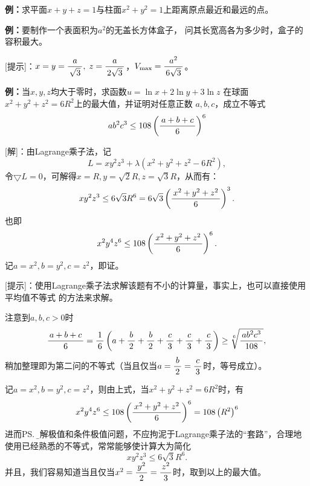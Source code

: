 {\bf 例：}求平面$x+y+z=1$与柱面$x^2+y^2=1$上距离原点最近和最远的点。
\begin{center}
\end{center}

{\bf 例：}要制作一个表面积为$a^2$的无盖长方体盒子，
问其长宽高各为多少时，盒子的容积最大。

[提示]：$x=y=\displaystyle\frac{\,{a}\,}{\,{\sqrt 3}\,},\;z=\displaystyle\frac{\,{a}\,}{\,{2\sqrt3}\,}$，$V_{\max}=\displaystyle\frac{\,{a^2}\,}{\,{6\sqrt 3}\,}$。

{\bf 例：}当$x,y,z$均大于零时，求函数$u=\ln x+2\ln y+3\ln z$
在球面$x^2+y^2+z^2=6R^2$上的最大值，并证明对任意正数
$a,b,c$，成立不等式
$$ab^2c^3\leq 108\left(\displaystyle\frac{\,{a+b+c}\,}{\,{6}\,}\right)^6$$

[解]：由Lagrange乘子法，记
$$L=xy^2z^3+\lambda(x^2+y^2+z^2-6R^2),$$
令$\bigtriangledown L=0$，可解得$x=R,y=\sqrt2 R,z=\sqrt3 R$，从而有：
$$xy^2z^3\leq 6\sqrt 3R^6=6\sqrt 3\left(\displaystyle\frac{\,{x^2+y^2+z^2}\,}{\,{6}\,}\right)^3.$$
也即
$$x^2y^4z^6\leq 108\left(\displaystyle\frac{\,{x^2+y^2+z^2}\,}{\,{6}\,}\right)^6.$$
记$a=x^2,b=y^2,c=z^2$，即证。\fin

[提示]：使用Lagrange乘子法求解该题有不小的计算量，事实上，也可以直接使用平均值不等式
的方法来求解。

注意到$a,b,c>0$时
$$\displaystyle\frac{\,{a+b+c}\,}{\,{6}\,}=\displaystyle\frac{\,{1}\,}{\,{6}\,}\left(a+\displaystyle\frac{\,{b}\,}{\,{2}\,}+\displaystyle\frac{\,{b}\,}{\,{2}\,}+\displaystyle\frac{\,{c}\,}{\,{3}\,}+\displaystyle\frac{\,{c}\,}{\,{3}\,}+\displaystyle\frac{\,{c}\,}{\,{3}\,}\right)
\geq \sqrt[6]{\displaystyle\frac{\,{ab^2c^3}\,}{\,{108}\,}},$$
稍加整理即为第二问的不等式（当且仅当$a=\displaystyle\frac{\,{b}\,}{\,{2}\,}=\displaystyle\frac{\,{c}\,}{\,{3}\,}$时，等号成立）。

记$a=x^2,b=y^2,c=z^2$，则由上式，当$x^2+y^2+z^2=6R^2$时，有
$$x^2y^4z^6\leq108\left(\displaystyle\frac{\,{x^2+y^2+z^2}\,}{\,{6}\,}\right)^6
=108\left(R^2\right)^6$$
进而\ps{\b 求解极值和条件极值问题，不应拘泥于Lagrange乘子法的“套路”，合理地
使用已经熟悉的不等式，常常能够使计算大为简化}
$$xy^2z^3\leq6\sqrt3R^6.$$
并且，我们容易知道当且仅当$x^2=\displaystyle\frac{\,{y^2}\,}{\,{2}\,}=\displaystyle\frac{\,{z^2}\,}{\,{3}\,}$时，取到以上的最大值。

